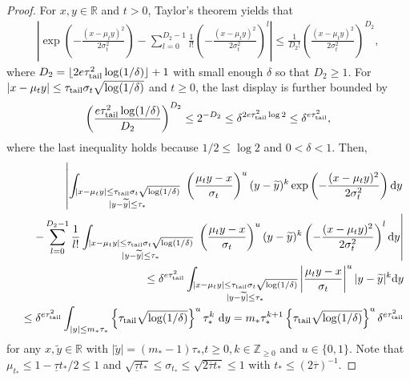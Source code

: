\documentclass[twoside,11pt]{article}
\newcommand{\bbR}{{\mathbb R}}
\newcommand{\bbZ}{{\mathbb Z}}
\newcommand{\bean}{\setlength\arraycolsep{1pt}\begin{eqnarray*}}
\newcommand{\eean}{\end{eqnarray*}}
\def\d{{\rm d}}
\begin{document}
\begin{proof}
For $x,y \in \bbR$ and $t > 0$, Taylor's theorem yields that 
\bean
\left\vert \exp \left( -\frac{(x-\mu_{t}y)^2}{2 \sigma_{t}^2} \right) - \sum_{l=0}^{D_{2}-1} \frac{1}{l!} \left( -\frac{(x-\mu_{t}y)^2}{2 \sigma_{t}^2} \right)^{l} \right\vert 
\leq \frac{1}{D_{2} !} \left( \frac{(x-\mu_{t}y)^2}{2 \sigma_{t}^2} \right)^{D_{2}},
\eean
where $D_{2} = \lfloor 2e \tau_{\rm tail}^2 \log(1/\delta) \rfloor +1$ with small enough $\delta$ so that $D_{2} \geq 1$.
For $\vert x - \mu_{t} y \vert \leq  \tau_{\rm tail} \sigma_{t} \sqrt{\log(1/\delta)}$ and $t \geq 0$, the last display is further bounded by
\bean
\left(\frac{e \tau_{\rm tail}^2 \log (1/\delta)  }{D_{2}} \right)^{D_{2}} \leq 2^{-D_{2}} \leq \delta^{2   e\tau_{\rm tail}^2  \log 2} \leq \delta^{e\tau_
{\rm tail}^2},
\eean
where the last inequality holds because $1/2 \leq \log 2$ and $0 < \delta < 1$.
Then,
\bean
&& \left\vert \int_{ \substack{\vert x - \mu_{t} y \vert \leq  \tau_{\rm tail} \sigma_{t} \sqrt{\log(1/\delta)} \\ \vert y - \widetilde y \vert \leq \tau_* } } \ \left(\frac{\mu_t y - x}{\sigma_t}\right)^{u}  (y-\widetilde y)^{k} \exp \left( -\frac{(x-\mu_{t}y)^2}{2 \sigma_{t}^2} \right)  \d y \right.
\\
&& \quad \left. - \sum_{l=0}^{D_{2}-1} \frac{1}{l!}
\int_{ \substack{ \vert x - \mu_{t} y \vert \leq \tau_{\rm tail} \sigma_{t} \sqrt{\log(1/\delta)} \\ \vert y - \widetilde y \vert \leq \tau_* } } \ \left(\frac{\mu_t y - x}{\sigma_t} \right)^{u}  (y-\widetilde y)^{k}  \left( -\frac{(x-\mu_{t}y)^2}{2 \sigma_{t}^2} \right)^{l} \d y \right\vert
\\
&& \leq \delta^{e\tau_{\rm tail}^2} \int_{ \substack{ \vert x - \mu_{t} y \vert \leq  \tau_{\rm tail} \sigma_{t} \sqrt{\log(1/\delta)} \\ \vert y - \widetilde y \vert \leq \tau_* } } \left\vert \frac{\mu_t y - x}{\sigma_t} \right\vert^{u} \vert y - \widetilde y \vert^{k} \d y 
\\
&& \leq \delta^{e\tau_{\rm tail}^2} \int_{\vert y \vert \leq m_* \tau_*} \left\{ \tau_{\rm tail} \sqrt{\log(1/\delta)} \right\}^{u}    \tau_*^{k}   \ \d y
= m_* \tau_*^{k+1} \left\{ \tau_{\rm tail} \sqrt{\log(1/\delta)} \right\}^{u} 
 \delta^{e\tau_{\rm tail}^2}
\eean
for any $x, \widetilde y \in \bbR$ with $\vert \widetilde y \vert = (m_*-1)\tau_*$,$t \geq 0, k \in \bbZ_{\geq 0}$ and $u \in \{0,1\}$.
Note that 
$ \mu_{t_*} \leq 1- \underline{\tau}t_* / 2 \leq 1$ and $\sqrt{\underline{\tau} t_*} \leq \sigma_{t_*} \leq \sqrt{2\overline{\tau}t_*} \leq 1$ with $t_* \leq (2\overline{\tau})^{-1}$.

\end{proof}
\end{document}
